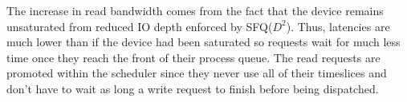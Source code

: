 The increase in read bandwidth comes from the fact that the device
remains unsaturated from reduced IO depth enforced by
SFQ($D^2$). Thus, latencies are much lower than if the device had been
saturated so requests wait for much less time once they reach the
front of their process queue. The read requests are promoted within
the scheduler since they never use all of their timeslices and don't
have to wait as long a write request to finish before being
dispatched. 
